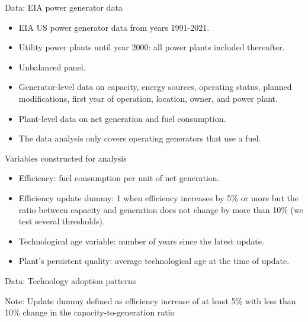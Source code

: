 \documentclass{beamer}
\begin{document}
\begin{frame}{Data: EIA power generator data}\label{Data}

\begin{itemize}
 \item EIA US power generator data from years 1991-2021.
 \item Utility power plants until year 2000: all power plants included thereafter. 
 \item Unbalanced panel.
 \item Generator-level data on capacity, energy sources, operating status, planned modifications, first year of operation, location, owner, and power plant.
 \item Plant-level data on net generation and fuel consumption.
  \item The data analysis only covers operating generators that use a fuel.


\end{itemize}

\hyperlink{Facts}{}
\end{frame}
\begin{frame}{Variables constructed for analysis}\label{variables}

 \begin{itemize}
     \item Efficiency: fuel consumption per unit of net generation.
     \item Efficiency update dummy: 1 when efficiency increases by 5\% or more but the ratio between capacity and generation does not change by more than 10\% (we test several thresholds).
     \item Technological age variable: number of years since the latest update.
     \item Plant's persistent quality: average technological age at the time of update.
 \end{itemize}
 
\hyperlink{efficall_dist}{}
\hyperlink{Years since latest update}{}
    
\end{frame}


\begin{frame}{Data: Technology adoption patterns}\label{patterns_1gen}
\begin{table}
\footnotesize
\centering
\caption{Update dummy regressed on covariates, single-generator plants}

\end{table}
\tiny{Note: Update dummy defined as efficiency increase of at least 5\% with less than 10\% change in the capacity-to-generation ratio }

\hyperlink{patterns_all}{}
\hyperlink{obscount}{}
\hyperlink{updatespattern}{}
\end{frame}
\end{document}
